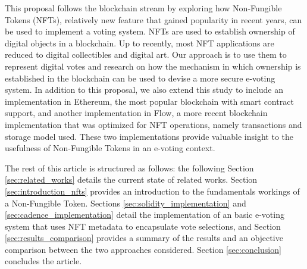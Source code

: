 \documentclass[../access.tex]{subfiles}
\begin{document}
\par
This proposal follows the blockchain stream by exploring how Non-Fungible Tokens (NFTs), relatively new feature that gained popularity in recent years, can be used to implement a voting system. NFTs are used to establish ownership of digital objects in a blockchain. Up to recently, most NFT applications are reduced to digital collectibles and digital art. Our approach is to use them to represent digital votes and research on how the mechanism in which ownership is established in the blockchain can be used to devise a more secure e-voting system. In addition to this proposal, we also extend this study to include an implementation in Ethereum, the most popular blockchain with smart contract support, and another implementation in Flow, a more recent blockchain implementation that was optimized for NFT operations, namely transactions and storage model used. These two implementations provide valuable insight to the usefulness of Non-Fungible Tokens in an e-voting context.
\par
The rest of this article is structured as follows: the following Section \ref{sec:related_works} details the current state of related works. Section \ref{sec:introduction_nfts} provides an introduction to the fundamentals workings of a Non-Fungible Token. Sections \ref{sec:solidity_implementation} and \ref{sec:cadence_implementation} detail the implementation of an basic e-voting system that uses NFT metadata to encapsulate vote selections, and Section \ref{sec:results_comparison} provides a summary of the results and an objective comparison between the two approaches considered. Section \ref{sec:conclusion} concludes the article.
\end{document}
